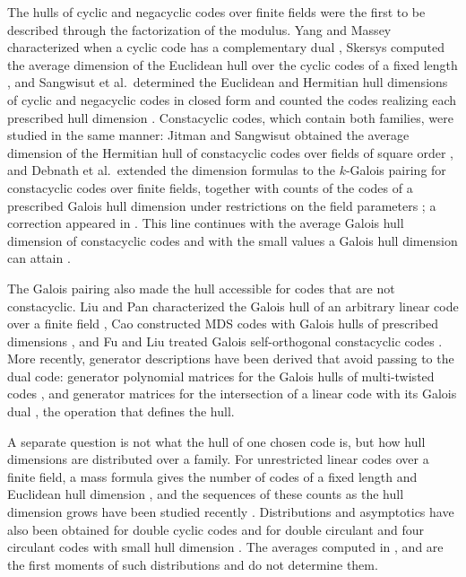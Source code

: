 The hulls of cyclic and negacyclic codes over finite fields were the first to be
described through the factorization of the modulus. Yang and Massey
characterized when a cyclic code has a complementary dual \cite{yangMassey1994},
Skersys computed the average dimension of the Euclidean hull over the cyclic
codes of a fixed length \cite{skersys2003}, and Sangwisut et al.\ determined the
Euclidean and Hermitian hull dimensions of cyclic and negacyclic codes in closed
form and counted the codes realizing each prescribed hull dimension
\cite{sangwisut2015}. Constacyclic codes, which contain both families, were
studied in the same manner: Jitman and Sangwisut obtained the average dimension
of the Hermitian hull of constacyclic codes over fields of square order
\cite{jitmanSangwisut2018}, and Debnath et al.\ extended the dimension formulas
to the $k$-Galois pairing for constacyclic codes over finite fields, together
with counts of the codes of a prescribed Galois hull dimension under
restrictions on the field parameters \cite{debnathConstacyclic2023}; a correction
appeared in \cite{debnathCorrection2023}. This line continues with the average
Galois hull dimension of constacyclic codes \cite{debnathAverage2025} and with
the small values a Galois hull dimension can attain \cite{debnathSmall2026}.

The Galois pairing also made the hull accessible for codes that are not
constacyclic. Liu and Pan characterized the Galois hull of an arbitrary linear
code over a finite field \cite{liuPan2020}, Cao constructed MDS codes with
Galois hulls of prescribed dimensions \cite{cao2021}, and Fu and Liu treated
Galois self-orthogonal constacyclic codes \cite{fuLiu2022}. More recently,
generator descriptions have been derived that avoid passing to the dual code:
generator polynomial matrices for the Galois hulls of multi-twisted codes
\cite{eldinSole2026}, and generator matrices for the intersection of a linear
code with its Galois dual \cite{eldinLeroy2026}, the operation that defines the
hull.

A separate question is not what the hull of one chosen code is, but how hull
dimensions are distributed over a family. For unrestricted linear codes over a
finite field, a mass formula gives the number of codes of a fixed length and
Euclidean hull dimension \cite{sendrier1997}, and the sequences of these counts
as the hull dimension grows have been studied recently \cite{bouyuklieva2026}.
Distributions and asymptotics have also been obtained for double cyclic codes
\cite{gao2023} and for double circulant and four circulant codes with small hull
dimension \cite{aliabadi2026}. The averages computed in \cite{skersys2003},
\cite{jitmanSangwisut2018} and \cite{debnathAverage2025} are the first moments of
such distributions and do not determine them.

